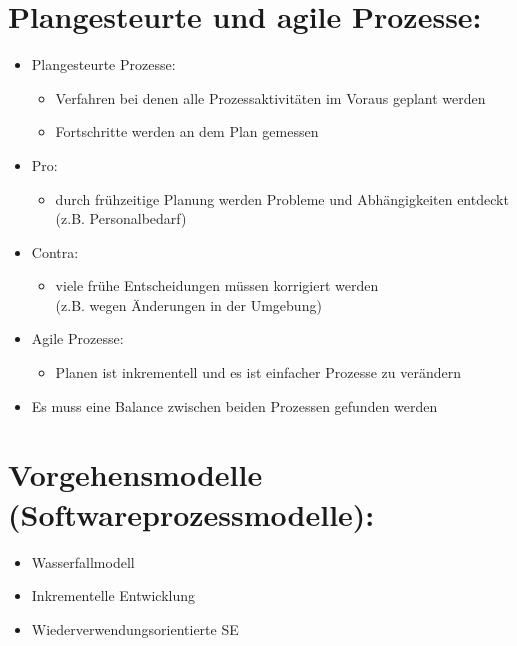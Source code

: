 \section{Plangesteurte und agile Prozesse:}
\begin{itemize}
    \item Plangesteurte Prozesse:
    \begin{itemize}
        \item Verfahren bei denen alle Prozessaktivitäten im Voraus geplant werden
        \item Fortschritte werden an dem Plan gemessen
    \end{itemize}
    \item Pro:
    \begin{itemize}
        \item durch frühzeitige Planung werden Probleme und Abhängigkeiten entdeckt\\
         (z.B. Personalbedarf)
    \end{itemize}
    \item Contra:
    \begin{itemize}
        \item viele frühe Entscheidungen müssen korrigiert werden \\
        (z.B. wegen Änderungen in der Umgebung)
    \end{itemize}
    \item Agile Prozesse:
    \begin{itemize}
        \item Planen ist inkrementell und es ist einfacher Prozesse zu verändern 
    \end{itemize}
    \item Es muss eine Balance zwischen beiden Prozessen gefunden werden
\end{itemize}

\section{Vorgehensmodelle (Softwareprozessmodelle):}
\begin{itemize}
    \item Wasserfallmodell
    \item Inkrementelle Entwicklung 
    \item Wiederverwendungsorientierte SE
\end{itemize}

